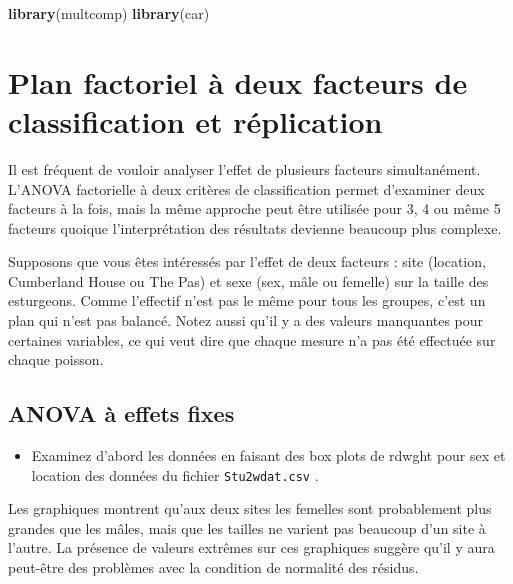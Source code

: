 \documentclass[12pt,]{book}
\newenvironment{Shaded}{\begin{snugshade}}{\end{snugshade}}
\newcommand{\KeywordTok}[1]{\textcolor[rgb]{0.27,0.27,0.27}{\textbf{#1}}}
\newcommand{\NormalTok}[1]{#1}
\providecommand{\tightlist}{%
  \setlength{\itemsep}{0pt}\setlength{\parskip}{0pt}}
\begin{document}
\begin{Shaded}
\begin{Highlighting}[]
\KeywordTok{library}\NormalTok{(multcomp)}
\KeywordTok{library}\NormalTok{(car)}
\end{Highlighting}
\end{Shaded}

\hypertarget{plan-factoriel-uxe0-deux-facteurs-de-classification-et-ruxe9plication}{%
\section{Plan factoriel à deux facteurs de classification et réplication}\label{plan-factoriel-uxe0-deux-facteurs-de-classification-et-ruxe9plication}}

Il est fréquent de vouloir analyser l'effet de plusieurs facteurs simultanément. L'ANOVA factorielle à deux critères de classification permet d'examiner deux facteurs à la fois, mais la même approche peut être utilisée pour 3, 4 ou même 5 facteurs quoique l'interprétation des résultats devienne beaucoup plus complexe.

Supposons que vous êtes intéressés par l'effet de deux facteurs : site (location, Cumberland House ou The Pas) et sexe (sex, mâle ou femelle) sur la taille des esturgeons. Comme l'effectif n'est pas le même pour tous les groupes, c'est un plan qui n'est pas balancé. Notez aussi qu'il y a des valeurs manquantes pour certaines variables, ce qui veut dire que chaque mesure n'a pas été effectuée sur chaque poisson.

\hypertarget{anova-uxe0-effets-fixes}{%
\subsection{ANOVA à effets fixes}\label{anova-uxe0-effets-fixes}}

\begin{itemize}
\tightlist
\item
  Examinez d'abord les données en faisant des box plots de rdwght pour sex et location des données du fichier \texttt{Stu2wdat.csv} .
\end{itemize}

Les graphiques montrent qu'aux deux sites les femelles sont probablement plus grandes que les mâles, mais que les tailles ne varient pas beaucoup d'un site à l'autre. La présence de valeurs extrêmes sur ces graphiques suggère qu'il y aura peut-être des problèmes avec la condition de normalité des résidus.
\end{document}

